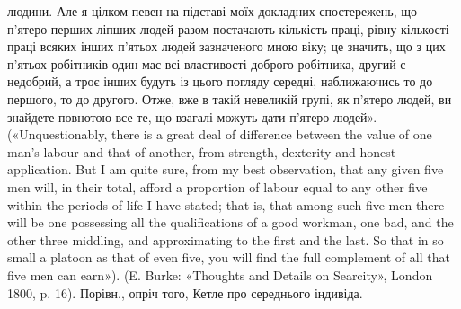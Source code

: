 людини. Але я цілком певен на підставі моїх докладних спостережень, що
п’ятеро перших-ліпших людей разом постачають кількість праці, рівну
кількості праці всяких інших п'ятьох людей зазначеного мною віку; це
значить, що з цих п’ятьох робітників один має всі властивості доброго
робітника, другий є недобрий, а троє інших будуть із цього погляду середні, наближаючись то до
першого, то до другого. Отже, вже в такій
невеликій групі, як п’ятеро людей, ви знайдете повнотою все те, що взагалі
можуть дати п'ятеро людей». («Unquestionably, there is a great deal
of difference between the value of one man’s labour and that of another,
from strength, dexterity and honest application. But I am quite sure, from
my best observation, that any given five men will, in their total, afford a
proportion of labour equal to any other five within the periods of life I have
stated; that is, that among such five men there will be one possessing all
the qualifications of a good workman, one bad, and the other three middling,
and approximating to the first and the last. So that in so small a platoon
as that of even five, you will find the full complement of all that five men
can earn»). (E. Burke: «Thoughts and Details on Searcity», London
1800, p. 16). Порівн., опріч того, Кетле про середнього індивіда.
\parbreak{}  %
